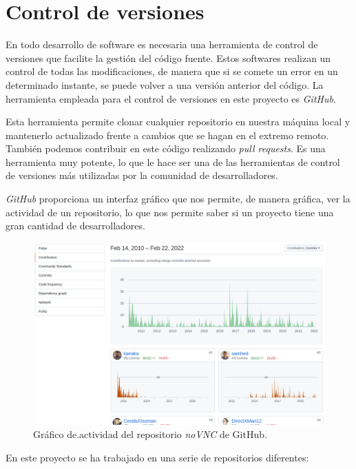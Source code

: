 \documentclass[a4paper, 12pt]{book}
\begin{document}
\section{Control de versiones}
\label{sec:control-de-versiones}

En todo desarrollo de software es necesaria una herramienta de control de versiones que facilite la gestión del código fuente. Estos softwares realizan un control de todas las modificaciones, de manera que si se comete un error en un determinado instante, se puede volver a una versión anterior del código. La herramienta empleada para el control de versiones en este proyecto es \emph{GitHub}.

Esta herramienta permite clonar cualquier repositorio en nuestra máquina local y mantenerlo actualizado frente a cambios que se hagan en el extremo remoto. También podemos contribuir en este código realizando \emph{pull requests}. Es una herramienta muy potente, lo que le hace ser una de las herramientas de control de versiones más utilizadas por la comunidad de desarrolladores.

\emph{GitHub} proporciona un interfaz gráfico que nos permite, de manera gráfica, ver la actividad de un repositorio, lo que nos permite saber si un proyecto tiene una gran cantidad de desarrolladores.

\begin{figure}[H]
	\centering
    \includegraphics[width=15cm]{img/github_contributors.png}
    \caption{Gráfico de.actividad del repositorio \emph{noVNC} de GitHub.}
    \label{figura:simulador_gazebo}
\end{figure}

En este proyecto se ha trabajado en una serie de repositorios diferentes:
\end{document}
